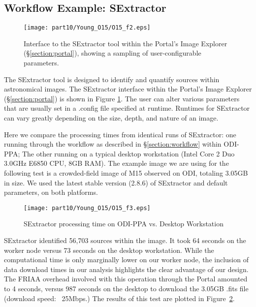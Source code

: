 \subsection{Workflow Example: SExtractor}
\label{section:sextractor}

\begin{figure}[ht]
\texttt{[image: part10/Young\_O15/O15\_f2.eps]}
\caption{Interface to the SExtractor tool within the Portal's Image Explorer (\S\ref{section:portal}), showing a sampling of user-configurable parameters.}
\label{fig:sextractor}
\end{figure}

The SExtractor tool is designed to identify and quantify sources within astronomical images.  The SExtractor interface within the Portal's Image Explorer (\S\ref{section:portal}) is shown in Figure \ref{fig:sextractor}.  The user can alter various parameters that are usually set in a .config file specified at runtime.  Runtimes for SExtractor can vary greatly depending on the size, depth, and nature of an image.  

Here we compare the processing times from identical runs of SExtractor: one running through the workflow as described in \S\ref{section:workflow} within ODI-PPA; The other running on a typical desktop workstation (Intel Core 2 Duo 3.0GHz E6850 CPU, 8GB RAM). The example image we are using for the following test is a crowded-field image of M15 observed on ODI, totaling 3.05GB in size. We used the latest stable version (2.8.6) of SExtractor and default parameters, on both platforms.

\begin{figure}[ht]
\texttt{[image: part10/Young\_O15/O15\_f3.eps]}
\caption{SExtractor processing time on ODI-PPA vs. Desktop Workstation}
\label{fig:sex_run}
\end{figure}

SExtractor identified 56,703 sources within the image. It took 64 seconds on the worker node versus 73 seconds on the desktop workstation.  While the computational time is only marginally lower on our worker node, the inclusion of data download times in our analysis highlights the clear advantage of our design.  The FRIAA overhead involved with this operation through the Portal amounted to 4 seconds, versus 987 seconds on the desktop to download the 3.05GB .fits file (download speed: ~25Mbps.)  The results of this test are plotted in Figure~\ref{fig:sex_run}.

